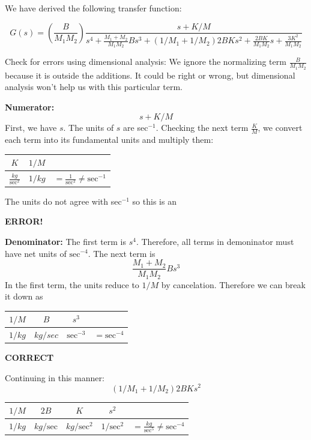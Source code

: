 \begin{Example}\label{DimensionalAnalysisExample}

We have derived the following transfer function:

\[
G(s) = \left( \frac {B} {M_1M_2}\right) \frac{s+K/M}
 {s^4 + \frac{M_1+M_2}{M_1M_2}Bs^3+(1/M_1+1/M_2)2BKs^2+\frac{2BK}{M_1M_2}s+\frac{3K^2}{M_1M_2}}
\]

Check for errors using dimensional analysis:
We  ignore the normalizing term $\frac{B}{M_1M_2}$ because it is outside the additions.  It could be right or wrong, but
dimensional analysis won't help us with this particular term.


{\bf Numerator:}
\[
s+K/M
\]
First, we have $s$.  The units of $s$ are sec$^{-1}$.  Checking the next term $\frac{K}{M}$, we convert each term into its fundamental units and multiply them:

\begin{tabular}{c|c|c}
$K$ 	&	$1/M$  &	\\ \hline
$\frac{kg}{\mathrm{sec}^2}$ & $1/kg$ & $= \frac{1}{\mathrm{sec}^2} \neq \mathrm{sec}^{-1}$ \\
\end{tabular}

The units do not agree with sec$^{-1}$ so this is an
\vspace{0.075in}

{\bf ERROR!}

\vspace{0.075in}

{\bf Denominator: }
\vspace{0.2in}
The first term is $s^4$.  Therefore, all terms in demoninator must have net units of $\mathrm{sec}^{-4}$.  The next term is
\[
\frac{M_1+M_2}{M_1M_2}Bs^3
\]
In the first term, the units reduce to $1/M$ by cancelation.   Therefore we can break it down as

\begin{tabular}{c|c|c|c}
$1/M$	& $B$      & $s^3$ & \\ \hline
$1/kg$  & $kg/sec$ & $\mathrm{sec}^{-3}$ & $= \mathrm{sec}^{-4}$
\end{tabular}

\vspace{0.075in}
{\bf CORRECT}

Continuing in this manner:
\[
(1/M_1+1/M_2)2BKs^2
\]

\begin{tabular}{c|c|c|c|c}
$1/M$	& $2B$	& $K$	& $s^2$ & \\ \hline
$1/kg$  & $kg/\mathrm{sec}$	& $kg/\mathrm{sec}^2$	& $1/\mathrm{sec}^2$	& $= \frac{kg}{\mathrm{sec}^5} \neq \mathrm{sec}^{-4}$
\end{tabular}


\end{Example}
